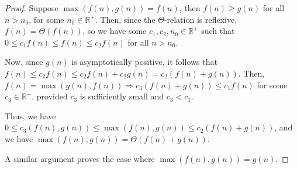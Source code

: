 \begin{proof}
  Suppose $\max{(f(n), g(n))} = f(n)$, then $f(n) \geq g(n)$ for all $n > n_0$,
  for some $n_0 \in \mathbb{R}^+$. Then, since the $\Theta$-relation
  is reflexive,
  $f(n) = \Theta(f(n))$, so we have some $c_1, c_2, n_0 \in
  \mathbb{R}^+$ such that
  $0 \leq c_1 f(n) \leq f(n) \leq c_2 f(n)$ for all $n > n_0$.

  Now, since $g(n)$ is asymptotically positive, it follows that
  $f(n) \leq c_2 f(n) \leq c_2 f(n) + c_2 g(n) = c_2(f(n) + g(n))$.
  Then, $f(n) = \max{(g(n), f(n))} \Rightarrow c_3(f(n) + g(n)) \leq
  c_1 f(n)$ for
  some $c_3 \in \mathbb{R}^+$, provided $c_3$ is sufficiently small
  and $c_3 < c_1$.

  Thus, we have $0 \leq c_3(f(n), g(n)) \leq \max{(f(n), g(n))} \leq
  c_2(f(n) + g(n))$,
  and we have $\max{(f(n), g(n))} = \Theta(f(n) + g(n))$.

  A similar argument proves the case where $\max{(f(n), g(n))} = g(n)$.
\end{proof}
